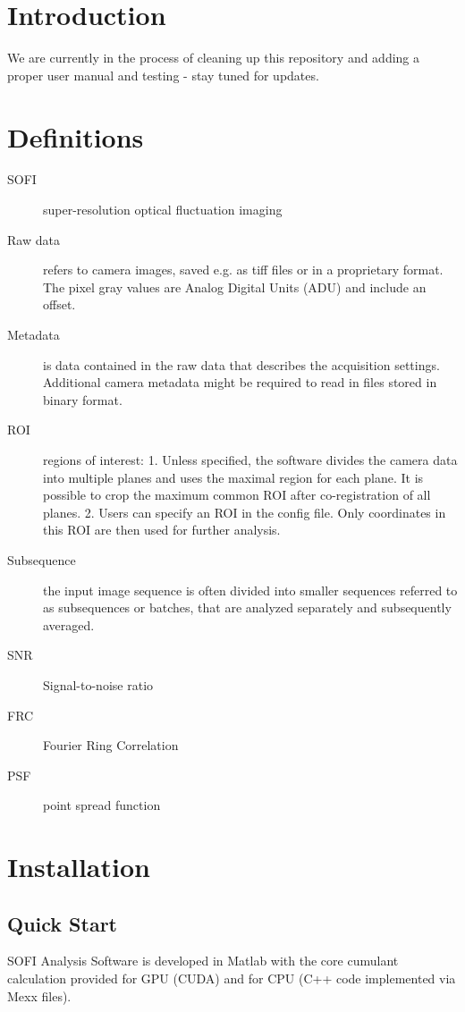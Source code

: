\documentclass[final]{scrartcl}
\begin{document}
\pagestyle{empty}

\section{Introduction}
We are currently in the process of cleaning up this repository 
and adding a proper user manual and testing - stay tuned for updates.

\section{Definitions}
\begin{description}
    \item[SOFI] super-resolution optical fluctuation imaging
    \item[Raw data] refers to camera images, saved e.g. as tiff files or in a proprietary format. The pixel gray values are Analog Digital Units (ADU) and include an offset.
    \item[Metadata] is data contained in the raw data that describes the acquisition settings. Additional camera metadata might be required to read in files stored in binary format.\\
    \item[ROI] regions of interest: 
    1. Unless specified, the software divides the camera data into multiple planes and uses the maximal region for each plane. It is possible to crop the maximum common ROI after co-registration of all planes.
    2. Users can specify an ROI in the config file. Only coordinates in this ROI are then used for further analysis.
    \item[Subsequence] the input image sequence is often divided into smaller sequences referred to as subsequences or batches, that are analyzed separately and subsequently averaged.
    \item[SNR] Signal-to-noise ratio
    \item[FRC] Fourier Ring Correlation
    \item[PSF] point spread function
\end{description}

\section{Installation}
\subsection{Quick Start}
    SOFI Analysis Software is developed in Matlab with the core cumulant
    calculation provided for GPU (CUDA) and for CPU (C++ code implemented via Mexx files). 
\end{document}
